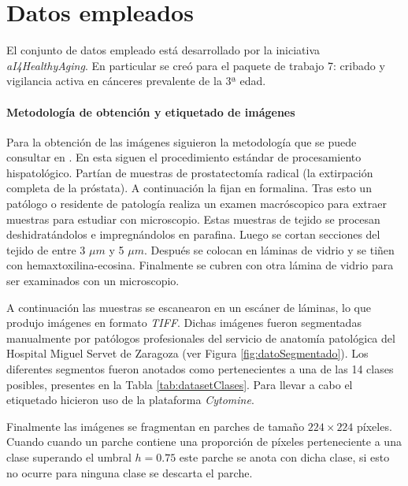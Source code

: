 \section{Datos empleados} \label{sec:datos}

El conjunto de datos empleado está desarrollado por la iniciativa \textit{aI4HealthyAging}. En particular se creó para el paquete de trabajo 7: cribado y vigilancia activa en cánceres prevalente de la 3ª edad.


\paragraph*{Metodología de obtención y etiquetado de imágenes}

Para la obtención de las imágenes siguieron la metodología que se puede consultar en \cite{datosObtencion}. En esta siguen el procedimiento estándar de procesamiento hispatológico. Partían de muestras de prostatectomía radical (la extirpación completa de la próstata). A continuación la fijan en formalina. Tras esto un patólogo o residente de patología realiza un examen macróscopico para extraer muestras para estudiar con microscopio. Estas muestras de tejido se procesan deshidratándolos e impregnándolos en parafina. Luego se cortan secciones del tejido de entre 3 $\mu m$ y 5 $\mu m$. Después se colocan en láminas de vidrio y se tiñen con hemaxtoxilina-ecosina. Finalmente se cubren con otra lámina de vidrio para ser examinados con un microscopio.

A continuación las muestras se escanearon en un escáner de láminas, lo que produjo imágenes en formato \textit{TIFF}. Dichas imágenes fueron segmentadas manualmente por patólogos profesionales del servicio de anatomía patológica del Hospital Miguel Servet de Zaragoza (ver Figura \ref{fig:datoSegmentado}). Los diferentes segmentos fueron anotados como pertenecientes a una de las 14 clases posibles, presentes en la Tabla \ref{tab:datasetClases}. Para llevar a cabo el etiquetado hicieron uso de la plataforma \textit{Cytomine}. 


Finalmente las imágenes se fragmentan en parches de tamaño $224\times 224$ píxeles. Cuando cuando un parche contiene una proporción de píxeles perteneciente a una clase superando el umbral $h = 0.75$ este parche se anota con dicha clase, si esto no ocurre para ninguna clase se descarta el parche. 

